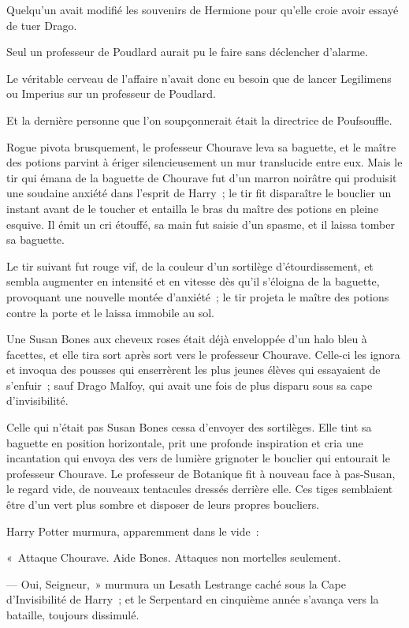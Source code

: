 Quelqu'un avait modifié les souvenirs de Hermione pour qu'elle croie avoir essayé de tuer Drago.

Seul un professeur de Poudlard aurait pu le faire sans déclencher d'alarme.

Le véritable cerveau de l'affaire n'avait donc eu besoin que de lancer Legilimens ou Imperius sur un professeur de Poudlard.

Et la dernière personne que l'on soupçonnerait était la directrice de Poufsouffle.

Rogue pivota brusquement, le professeur Chourave leva sa baguette, et le maître des potions parvint à ériger silencieusement un mur translucide entre eux.
Mais le tir qui émana de la baguette de Chourave fut d'un marron noirâtre qui produisit une soudaine anxiété dans l'esprit de Harry~; le tir fit disparaître le bouclier un instant avant de le toucher et entailla le bras du maître des potions en pleine esquive.
Il émit un cri étouffé, sa main fut saisie d'un spasme, et il laissa tomber sa baguette.

Le tir suivant fut rouge vif, de la couleur d'un sortilège d'étourdissement, et sembla augmenter en intensité et en vitesse dès qu'il s'éloigna de la baguette, provoquant une nouvelle montée d'anxiété~; le tir projeta le maître des potions contre la porte et le laissa immobile au sol.

Une Susan Bones aux cheveux roses était déjà enveloppée d'un halo bleu à facettes, et elle tira sort après sort vers le professeur Chourave.
Celle-ci les ignora et invoqua des pousses qui enserrèrent les plus jeunes élèves qui essayaient de s'enfuir~; sauf Drago Malfoy, qui avait une fois de plus disparu sous sa cape d'invisibilité.

Celle qui n'était pas Susan Bones cessa d'envoyer des sortilèges.
Elle tint sa baguette en position horizontale, prit une profonde inspiration et cria une incantation qui envoya des vers de lumière grignoter le bouclier qui entourait le professeur Chourave.
Le professeur de Botanique fit à nouveau face à pas-Susan, le regard vide, de nouveaux tentacules dressés derrière elle.
Ces tiges semblaient être d'un vert plus sombre et disposer de leurs propres boucliers.

Harry Potter murmura, apparemment dans le vide~:

«~Attaque Chourave.
Aide Bones.
Attaques non mortelles seulement.

--- Oui, Seigneur,~» murmura un Lesath Lestrange caché sous la Cape d'Invisibilité de Harry~; et le Serpentard en cinquième année s'avança vers la bataille, toujours dissimulé.

